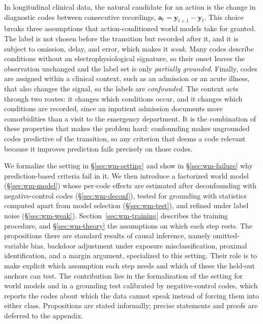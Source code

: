 In longitudinal clinical data, the natural candidate for an action is the change in diagnostic codes between consecutive recordings, $\mathbf{a}_t=\mathbf{y}_{t+1}-\mathbf{y}_t$. This choice breaks three assumptions that action-conditioned world models take for granted. The label is not chosen before the transition but recorded after it, and it is subject to omission, delay, and error, which makes it \emph{weak}. Many codes describe conditions without an electrophysiological signature, so their onset leaves the observation unchanged and the label set is only \emph{partially grounded}. Finally, codes are assigned within a clinical context, such as an admission or an acute illness, that also changes the signal, so the labels are \emph{confounded}. The context acts through two routes: it changes which conditions occur, and it changes which conditions are recorded, since an inpatient admission documents more comorbidities than a visit to the emergency department. It is the combination of these properties that makes the problem hard: confounding makes ungrounded codes predictive of the transition, so any criterion that deems a code relevant because it improves prediction fails precisely on those codes.

We formalize the setting in \S\ref{sec:wm-setting} and show in \S\ref{sec:wm-failure} why prediction-based criteria fail in it. We then introduce a factorized world model (\S\ref{sec:wm-model}) whose per-code effects are estimated after deconfounding with negative-control codes (\S\ref{sec:wm-deconf}), tested for grounding with statistics computed apart from model selection (\S\ref{sec:wm-test}), and refined under label noise (\S\ref{sec:wm-weak}). Section~\ref{sec:wm-training} describes the training procedure, and \S\ref{sec:wm-theory} the assumptions on which each step rests. The propositions there are standard results of causal inference, namely omitted-variable bias, backdoor adjustment under exposure misclassification, proximal identification, and a margin argument, specialized to this setting. Their role is to make explicit which assumption each step needs and which of these the held-out anchors can test. The contribution lies in the formalization of the setting for world models and in a grounding test calibrated by negative-control codes, which reports the codes about which the data cannot speak instead of forcing them into either class. Propositions are stated informally; precise statements and proofs are deferred to the appendix.

